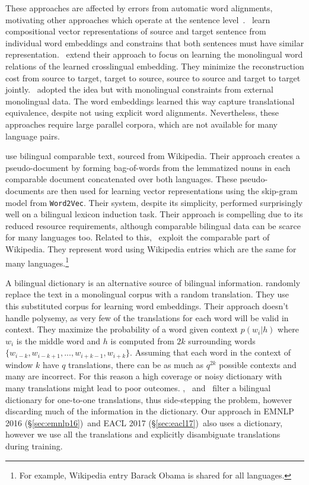 \documentclass[12pt,twoside,final,hidelinks]{ltthesis}
\theoremstyle{definition}
\newcommand\emnlpvi{EMNLP 2016 (\S\ref{sec:emnlp16})}
\newcommand\eaclvii{EACL 2017 (\S\ref{sec:eacl17})}
\begin{document}
These approaches are affected by errors from automatic word alignments, motivating other approaches which operate at the sentence level~\cite{Chandar-nips-14,DBLP:journals/corr/HermannB14,icml2015_gouws15}.~ learn compositional vector representations of source and target sentence from 
individual word embeddings and constrains that both sentences must have similar representation.~ extend their approach to 
focus on learning the monolingual word relations of the learned crosslingual embedding. They minimize the reconstruction cost from source to target, target to source, source to source and target 
to target jointly.~ adopted the idea but with monolingual constraints from external monolingual data. The word embeddings learned this 
way capture translational equivalence, despite not using explicit word alignments. Nevertheless, these approaches require large parallel corpora, which are not 
available for many language pairs.

 use bilingual comparable text, sourced from Wikipedia. 
Their approach creates a pseudo-document by forming bag-of-words from the lemmatized nouns in each comparable document concatenated over both languages.
These pseudo-documents are then used for learning vector representations using the skip-gram model from \texttt{Word2Vec}.
Their system, despite its simplicity, performed surprisingly well on a bilingual lexicon induction task. 
Their approach is compelling due to its reduced resource requirements, although comparable bilingual data can be scarce for many languages too. 
Related to this,~ exploit the comparable part of Wikipedia. They represent word using Wikipedia entries which are the same for many languages.\footnote{For example, Wikipedia entry Barack Obama is shared for all languages.} 

A bilingual dictionary is an alternative source of bilingual information.
 randomly replace the text in a monolingual corpus with a random translation. They use this substituted corpus for learning word embeddings. 
Their approach doesn't handle polysemy, as very few of the translations for each word will be valid in context. 
They maximize the probability of a word given context $p(w_i|h)$ where $w_i$ is the middle word and $h$ is computed from $2k$ surrounding words $\{w_{i-k}, w_{i-k+1}, ... , w_{i+k-1}, w_{i+k}\}$. 
Assuming that each word in the context of window $k$ have $q$ translations, there can be as much as $q^{2k}$ possible contexts and  many are  incorrect. 
For this reason a high coverage or noisy dictionary with many translations might lead to poor outcomes.
,~ and~ filter a bilingual dictionary for one-to-one translations, thus side-stepping the problem, however discarding much of the information in the dictionary. 
Our approach in \emnlpvi\ and \eaclvii\ also uses a dictionary, however we use all the translations and explicitly disambiguate translations during training. 
\end{document}
